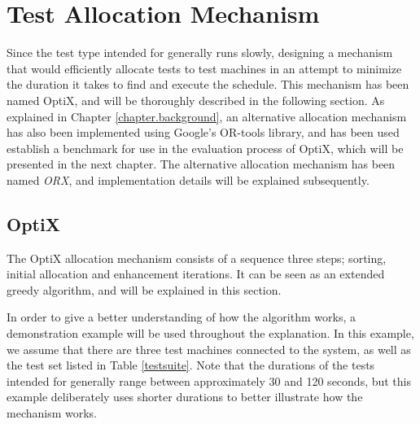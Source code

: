 \section{Test Allocation Mechanism}\label{chapter.allocation_mechanism}
\thispagestyle{plain}

Since the test type intended for \toolname \space generally runs slowly, designing a mechanism that would efficiently allocate tests to test machines in an attempt to minimize the duration it takes to find and execute the schedule. This mechanism has been named OptiX, and will be thoroughly described in the following section. As explained in Chapter \ref{chapter.background}, an alternative allocation mechanism has also been implemented using Google's OR-tools library, and has been used establish a benchmark for use in the evaluation process of OptiX, which will be presented in the next chapter. The alternative allocation mechanism has been named \emph{ORX}, and implementation details will be explained subsequently. 

\subsection{OptiX}\label{subsection.optix}


The OptiX allocation mechanism consists of a sequence three steps; sorting, initial allocation and enhancement iterations. It can be seen as an extended greedy algorithm, and will be explained in this section.

In order to give a better understanding of how the algorithm works, a demonstration example will be used throughout the explanation. In this example, we assume that there are three test machines connected to the system, as well as the test set listed in Table \ref{testsuite}. Note that the durations of the tests intended for \toolname \space generally range between approximately 30 and 120 seconds, but this example deliberately uses shorter durations to better illustrate how the mechanism works.

